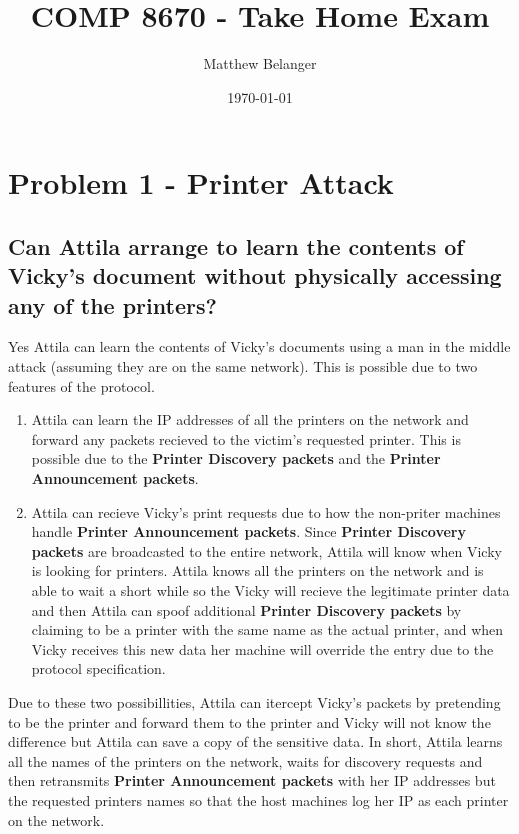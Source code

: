 \documentclass{article}
\title{COMP 8670 - Take Home Exam}
\author{Matthew Belanger}
\date{\today}
\begin{document}
\maketitle

\section{Problem 1 - Printer Attack}

\subsection{Can Attila arrange to learn the contents of Vicky’s document without physically
accessing any of the printers?}
	\label{subsec:learn_contents}

	Yes Attila can learn the contents of Vicky's documents using a man in the middle attack 
	(assuming they are on the same network). This is possible due to two features of the protocol.
	\begin{enumerate}
		\item Attila can learn the IP addresses of all the printers on 
			the network and forward any packets recieved to the victim's requested printer. 
			This is possible due to the \textbf{Printer Discovery packets} and the \textbf{Printer Announcement packets}.
		\item Attila can recieve Vicky's print requests due to how the non-priter machines handle \textbf{Printer Announcement packets}. 
			Since \textbf{Printer Discovery packets} are broadcasted to the entire network, Attila will know when Vicky is looking for printers.
			Attila knows all the printers on the network and is able to wait a short while so the Vicky will recieve the legitimate printer data and then Attila can spoof
			additional \textbf{Printer Discovery packets} by claiming to be a printer with the same name as the actual printer,
			and when Vicky receives this new data her machine will override the entry due to the protocol specification.
	\end{enumerate}
	Due to these two possibillities, Attila can itercept Vicky's packets by pretending to be the printer and forward them to the printer and Vicky will not know the
	difference but Attila can save a copy of the sensitive data. In short, Attila learns all the names of the printers on the network, waits for discovery 
	requests and then retransmits \textbf{Printer Announcement packets} with her IP addresses but the requested printers names so that the host machines log 
	her IP as each printer on the network.
\end{document}
